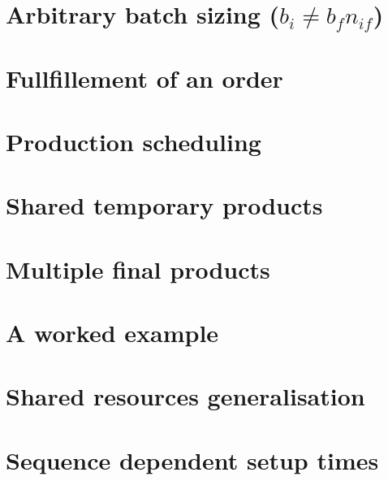 \documentclass{report}
\begin{document}
    \chapter{Arbitrary batch sizing ($b_i \ne b_fn_{if}$)}
    

    \chapter{Fullfillement of an order}
    

    \chapter{Production scheduling}
    

    \chapter{Shared temporary products}
    

    \chapter{Multiple final products}
    

    \chapter{A worked example}
    

    \chapter{Shared resources generalisation}
    

    \chapter{Sequence dependent setup times}
    
\end{document}
